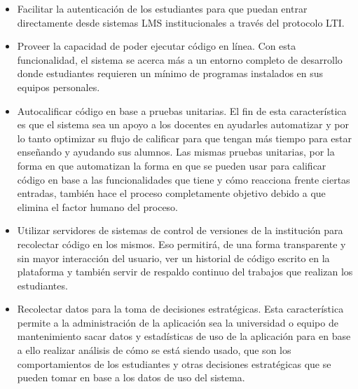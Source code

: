 \begin{itemize}
	\item Facilitar la autenticación de los estudiantes para que puedan entrar directamente desde sistemas LMS  institucionales a través del protocolo LTI. 
	\item {} Proveer la capacidad de poder ejecutar código en línea. Con esta funcionalidad, el sistema se acerca más a un entorno completo de desarrollo donde estudiantes requieren un mínimo de programas instalados en sus equipos personales. 
	\item {} Autocalificar código en base a pruebas unitarias. El fin de esta característica es que el sistema sea un apoyo a los docentes en ayudarles automatizar y por lo tanto optimizar su flujo de calificar para que tengan más tiempo para estar enseñando y ayudando sus alumnos. Las mismas pruebas unitarias, por la forma en que automatizan la forma en que se pueden usar para calificar código en base a las funcionalidades que tiene y cómo reacciona frente ciertas entradas, también hace el proceso completamente objetivo debido a que elimina el factor humano del proceso. 
	\item {} Utilizar servidores de sistemas de control de versiones de la institución para recolectar código en los mismos. Eso permitirá, de una forma transparente y sin mayor interacción del usuario, ver un historial de código escrito en la plataforma y también servir de respaldo continuo del trabajos que realizan los estudiantes.  
	\item {}  Recolectar datos para la toma de decisiones estratégicas. Esta característica permite a la administración de la aplicación sea la universidad o equipo de mantenimiento sacar datos y estadísticas de uso de la aplicación para en base a ello realizar análisis de cómo se está siendo usado, que son los comportamientos de los estudiantes y otras decisiones estratégicas que se pueden tomar en base a los datos de uso del sistema.  
\end{itemize}

